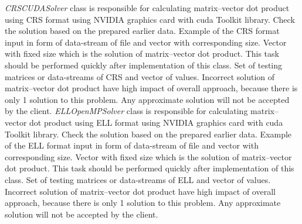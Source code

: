 	\clearpage
	{
		{
			\emph{CRSCUDASolver} class is responsible for calculating matrix--vector dot product using \gls{CRS} format using NVIDIA graphics card with \gls{cuda} Toolkit library.
		}
		{
			Check the solution based on the prepared earlier data.
		}
		{
			Example of the \gls{CRS} format input in form of data-stream of file and vector with corresponding size.
		}
		{
			Vector with fixed size which is the solution of matrix--vector dot product.
		}
		{
			This task should be performed quickly after implementation of this class.
		}
		{
			Set of testing matrices or data-streams of \gls{CRS} and vector of values.
		}
		{
			Incorrect solution of matrix--vector dot product have high impact of overall approach, because there is only 1 solution to this problem. Any approximate solution will not be accepted by the client.
		}
	}
	{
		{
			\emph{ELLOpenMPSolver} class is responsible for calculating matrix--vector dot product using \gls{ELL} format using NVIDIA graphics card with \gls{cuda} Toolkit library.
		}
		{
			Check the solution based on the prepared earlier data.
		}
		{
			Example of the \gls{ELL} format input in form of data-stream of file and vector with corresponding size.
		}
		{
			Vector with fixed size which is the solution of matrix--vector dot product.
		}
		{
			This task should be performed quickly after implementation of this class.
		}
		{
			Set of testing matrices or data-streams of \gls{ELL} and vector of values.
		}
		{
			Incorrect solution of matrix--vector dot product have high impact of overall approach, because there is only 1 solution to this problem. Any approximate solution will not be accepted by the client.
		}
	}